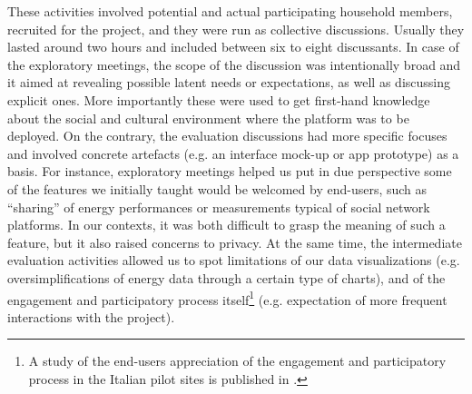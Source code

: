 These activities involved potential and actual participating household members, recruited for the project, and they
were run as collective discussions. Usually they lasted around two hours and included between six to eight discussants.
In case of the exploratory meetings, the scope of the discussion was intentionally broad and it aimed at revealing possible latent
needs or expectations, as well as discussing explicit ones. More importantly these were used to get first-hand knowledge
about the social and cultural environment where the platform was to be deployed. On the contrary, the evaluation discussions
had more specific focuses and involved concrete artefacts (e.g. an interface mock-up or app prototype)
as a basis.
% 
For instance, exploratory meetings helped us put in due perspective some of the features we initially taught
would be welcomed by end-users, such as ``sharing'' of energy performances or measurements typical of social network platforms.
In our contexts, it was both difficult to grasp the meaning of such a feature, but it also raised
 concerns to privacy. At the same time, the intermediate evaluation activities allowed us to spot
limitations of our data visualizations (e.g. oversimplifications of energy data through a certain type of charts),
and of the engagement and participatory process itself\footnote{A study of the end-users appreciation of the engagement and participatory process in the Italian pilot sites
is published in \cite{capaccioli_exploring_2017}.}
(e.g. expectation of more frequent interactions with the project).


